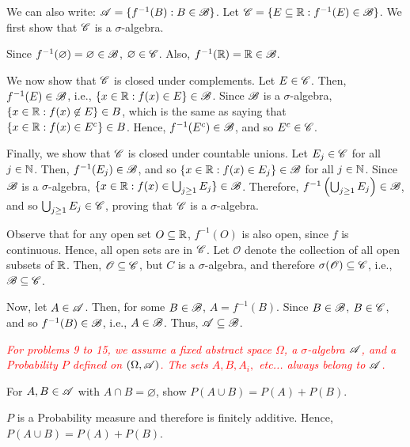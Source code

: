 \begin{solution}
    We can also write: $\mathscr{A} = \{ f^{-1}(B) : B \in \mathscr{B} \}$. Let $\mathscr{C} = \{ E \subseteq \mathbb{R} : f^{-1}(E) \in \mathscr{B} \}$. We first show that $\mathscr{C}$ is a $\sigma$-algebra. 

    Since $f^{-1}(\varnothing) = \varnothing \in \mathscr{B}$, $\varnothing \in \mathscr{C}$. Also, $f^{-1}(\mathbb{R}) = \mathbb{R} \in \mathscr{B}$. 

    We now show that $\mathscr{C}$ is closed under complements. Let $E \in \mathscr{C}$. Then, $f^{-1}(E) \in \mathscr{B}$, i.e., $\{ x \in \mathbb{R} : f(x) \in E \} \in \mathscr{B}$. Since $\mathscr{B}$ is a $\sigma$-algebra, $\{ x \in \mathbb{R} : f(x) \not\in E \} \in B$, which is the same as saying that $\{ x \in \mathbb{R} : f(x) \in E^c \} \in B$. Hence, $f^{-1}(E^c) \in \mathscr{B}$, and so $E^c \in \mathscr{C}$.

    Finally, we show that $\mathscr{C}$ is closed under countable unions. Let $E_j \in \mathscr{C}$ for all $j \in \mathbb{N}$. Then, $f^{-1}(E_j) \in \mathscr{B}$, and so $\{ x \in \mathbb{R} : f(x) \in E_j \} \in \mathscr{B}$ for all $j \in \mathbb{N}$. Since $\mathscr{B}$ is a $\sigma$-algebra, $\{ x \in \mathbb{R} : f(x) \in \bigcup_{j \geq 1} E_j \} \in \mathscr{B}$. Therefore, $f^{-1}\left(\bigcup_{j \geq 1} E_j \right) \in \mathscr{B}$, and so $\bigcup_{j \geq 1} E_j \in \mathscr{C}$, proving that $\mathscr{C}$ is a $\sigma$-algebra.

    Observe that for any open set $O \subseteq \mathbb{R}$, $f^{-1}(O)$ is also open, since $f$ is continuous. Hence, all open sets are in $\mathscr{C}$. Let $\mathscr{O}$ denote the collection of all open subsets of $\mathbb{R}$. Then, $\mathscr{O} \subseteq \mathscr{C}$, but $C$ is a $\sigma$-algebra, and therefore $\sigma(\mathscr{O}) \subseteq \mathscr{C}$, i.e., $\mathscr{B} \subseteq \mathscr{C}$.

    Now, let $A \in \mathscr{A}$. Then, for some $B \in \mathscr{B}$, $A = f^{-1}(B)$. Since $B \in \mathscr{B}$, $B \in \mathscr{C}$, and so $f^{-1}(B) \in \mathscr{B}$, i.e., $A \in \mathscr{B}$. Thus, $\mathscr{A} \subseteq \mathscr{B}$.
\end{solution}


\textcolor{red}{\textit{For problems 9 to 15, we assume a fixed abstract space $\Omega$, a $\sigma$-algebra $\mathscr{A}$, and a Probability $P$ defined on $(\Omega, \mathscr{A})$. The sets $A, B, A_i,$ etc... always belong to $\mathscr{A}$.}}

\begin{problem}
    For $A, B \in \mathscr{A}$ with $A \cap B = \varnothing$, show $P(A \cup B) = P(A) + P(B)$.
\end{problem}

\begin{solution}
    $P$ is a Probability measure and therefore is finitely additive. Hence, $P(A \cup B) = P(A) + P(B)$.
\end{solution}


